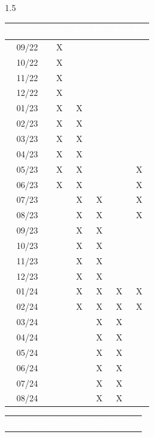 \documentclass[a4paper,12pt,openright,oneside]{book}
\newenvironment{myenv}[1]
  {\begin{spacing}{#1}}
  {\end{spacing}}
\begin{document}
\begin{myenv}{1.5}
\begin{table}[htbp]
				\begin{minipage}{0.45\textwidth}
					\centering
					\begin{tabular}{|c|c|c|c|c|c|}
						\hline
						\rowcolor{headerblue}
						\textcolor{white}{Ms/Ano} & \textcolor{white}{E1} & \textcolor{white}{E2} & \textcolor{white}{E3} & \textcolor{white}{E4} & \textcolor{white}{E5} \\
						\hline
						09/22 & X & & & & \\
						10/22 & X & & & & \\
						11/22 & X & & & & \\
						12/22 & X & & & & \\
						01/23 & X & X & & & \\
						02/23 & X & X & & & \\
						03/23 & X & X & & & \\
						04/23 & X & X & & & \\
						05/23 & X & X & & & X \\
						06/23 & X & X & & & X \\
						07/23 & & X & X & & X \\
						08/23 & & X & X & & X \\
						09/23 & & X & X & & \\
						10/23 & & X & X & & \\
						11/23 & & X & X & & \\
						12/23 & & X & X & & \\
						01/24 & & X & X & X & X \\
						02/24 & & X & X & X & X \\
						03/24 & & & X & X & \\
						04/24 & & & X & X & \\
						05/24 & & & X & X & \\
						06/24 & & & X & X & \\
						07/24 & & & X & X & \\
						08/24 & & & X & X & \\
						\hline
					\end{tabular}
				\end{minipage}
				\hfill
				\begin{minipage}{0.45\textwidth}
					\centering
					\begin{tabular}{|c|c|c|c|c|c|}
						\hline
						\rowcolor{headerblue}
						\textcolor{white}{Mês/Ano} & \textcolor{white}{E1} & \textcolor{white}{E2} & \textcolor{white}{E3} & \textcolor{white}{E4} & \textcolor{white}{E5} \\

\end{tabular}
\end{minipage}
\end{table}
\end{myenv}
\end{document}
